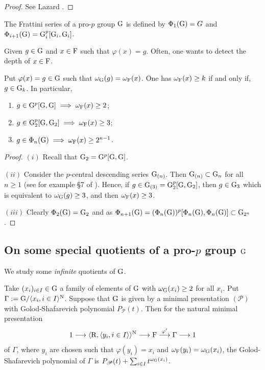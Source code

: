 \documentclass[12pt,a4paper,twoside,english]{smfart}
\def\N{{\rm N}}
\def\R{{\rm R}}
\def\G{{\rm G}}
\def\F{{\rm F}}
\def\PP{{\mathcal P}}
\begin{document}
\begin{proof}
See Lazard \cite[Appendice 3, Th. 3.5, page 205]{Lazard}.
\end{proof}

\begin{defi}\label{defi:Frattini} The Frattini series of a pro-$p$ group $\G$ is defined by
$\Phi_1(\G)=G$ and $\Phi_{i+1}(\G) = \G^p_i[\G_i,\G_i]$.


\end{defi}

Given $g\in \G$ and $x\in \F$ such that $\varphi(x)=g$. Often, one wants to detect the depth of $x\in \F$.

\begin{prop}\label{corollary:detect} Put $\varphi(x)=g\in \G$ such that $\omega_\G(g)=\omega_\F(x)$.
One has $\omega_\F(x)\geq  k$ if and only if,  $g \in \G_k$. 
In particular, 
\begin{enumerate}
\item[$(i)$]  $g \in  \G^p[\G,\G] \implies \omega_\F(x) \geq 2$;
\item[$(ii)$]   $g  \in \G_2^p[\G,\G_2] \implies \omega_\F(x) \geq 3$;
\item[$(iii)$]  $g \in \Phi_n(\G) \implies  \omega_\F(x) \geq 2^{n-1}$. 
\end{enumerate}
\end{prop}

\begin{proof}
$(i)$ Recall that $\G_2=\G^p[\G,\G]$.

$(ii)$ Consider  the $p$-central descending series $\G_{(n)}$.
Then $\G_{(n)} \subset \G_n$ for all $n\geq 1$ (see for example \S 7 of \cite{Koch}).   Hence, if $g \in \G_{(3)}=\G_2^p[\G,\G_2]$, then $g\in \G_3$ which is equivalent to  $\omega_\G(g) \geq 3$, and then $\omega_\F(x) \geq 3$.

$(iii)$   Clearly $\Phi_2(\G)= \G_2$ and as $\Phi_{n+1}(\G) = ( \Phi_n(\G))^p [ \Phi_n(\G),\Phi_n(\G)] \subset \G_{2^n}$. 
\end{proof}


  
  
  
  \subsection{On some special quotients of a pro-$p$ group $\G$}
We study some {\em infinite} quotients of $\G$.


\begin{prop} \label{prop-seriesofquotient}
Take $(x_i)_{i \in I} \in \G$  a family of elements of $\G$ 
with $\omega_\G(x_i) \geq 2$ for all $x_i$.
Put $\Gamma:=\G/\langle x_i, i \in I \rangle^\N$. Suppose that $\G$ is given by a minimal presentation $(\PP)$ with Golod-Shafarevich polynomial $P_\PP(t)$. Then for the natural minimal presentation $$\displaystyle{1\longrightarrow \langle \R, \langle y_i,i \in I \rangle \rangle^\N  \longrightarrow \F 
\stackrel{\varphi'}{\longrightarrow} \Gamma \longrightarrow 1}$$ of $\Gamma$, where $y_i$ are chosen such that $\varphi(y_i)=x_i$ 
and $\omega_\F(y_i)=\omega_\G(x_i)$,
 the Golod-Shafarevich polynomial  of $\Gamma$ is $P_\PP(t) + \sum_{i\in I} t^{\omega_\G(x_i)}$.
\end{prop}
\end{document}
